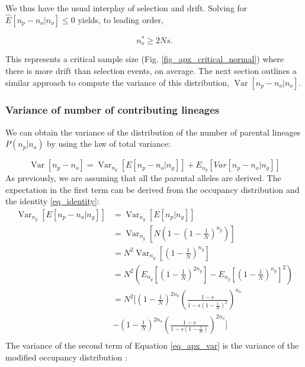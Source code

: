 \documentclass[9pt,twocolumn,twoside,lineno]{gsajnl}
\newcommand{\Var}{\operatorname{Var}}
\begin{document}
We thus have the usual interplay of selection and drift. Solving for $ \hat{E}[n_p -n_o | n_o]\leq0$
yields, to leading order,

\begin{equation}
  n_o^* \ge 2N s.
\end{equation}

This represents a critical sample size (Fig.
\ref{fig_apx_critical_normal}) where there is more drift than selection events, on average.
The next section outlines a similar approach to compute the variance of this distribution, $\operatorname{Var}[n_p-n_o | n_o].$

\subsubsection{Variance of number of contributing lineages}
\label{subsec_apx_variance}

We can obtain the variance of the distribution of the number of parental lineages $P(n_p | n_o)$ by using the law of total variance:

\begin{equation}
  \label{eq_apx_var}
\Var\left[n_p-n_o \right] = \Var_{n_g}\left[E\left[n_p-n_o | n_g \right]\right]+  E_{n_g}\left[Var\left[n_p-n_o | n_g \right]\right]
\end{equation}
As previously, we are assuming that all the parental alleles are derived.
The expectation in the first term can be derived from the occupancy distribution and the identity
\ref{eq_identity}:
\begin{equation}
\begin{split}
\Var_{n_g}\left[E\left[n_p-n_o | n_g \right]\right] &= \Var_{n_g}\left[E\left[n_p| n_g \right]\right] \\
&= \Var_{n_g}\left[N\left(1-(1-\frac{1}{N})^{n_g} \right) \right] \\
&= N^2 \Var_{n_g}\left[(1-\frac{1}{N})^{n_g} \right] \\
&= N^2 \left( E_{n_g}\left[(1-\frac{1}{N})^{2n_g} \right] - E_{n_g}\left[(1-\frac{1}{N})^{n_g} \right]^2\right) \\
&= N^2 \Bigg[ \left(1-\frac{1}{N}\right)^{2n_o} \left(\frac{1-s}{1-s \left(1-\frac{1}{N}\right)^2}\right)^{n_o} \\
&- \left(1-\frac{1}{N}\right)^{2n_o} \left(\frac{1-s}{1-s \left(1-\frac{1}{N}\right)}\right)^{2n_o}\Bigg] \\
\end{split}
\end{equation}
The variance of the second term of Equation \eqref{eq_apx_var} is the variance of the modified occupancy
distribution \cite{JohnsonEtAl2005}:
\end{document}
